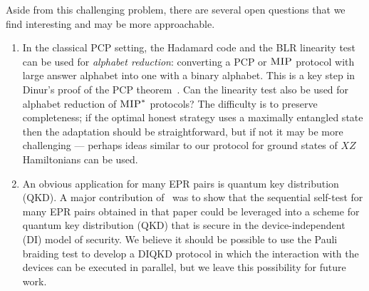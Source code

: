\documentclass[11pt,letterpaper]{article}
\newcommand{\<}{\langle}
\renewcommand{\>}{\rangle}
\newcommand{\MIP}{\textsc{MIP}}
\begin{document}
Aside from this challenging problem, there are several open questions that we find
interesting and may be more approachable.
\begin{enumerate}
\item In the classical PCP setting, the Hadamard code and the BLR
  linearity test can be used for \emph{alphabet reduction}: converting
  a PCP or $\MIP$ protocol with large answer alphabet into one with
  a binary alphabet. This is a key step in Dinur's proof of the PCP
  theorem~\cite{Dinur07pcp}. Can the linearity test also be used for
  alphabet reduction of $\MIP^*$ protocols? The difficulty is to preserve completeness; if the optimal honest strategy uses a maximally entangled state then the adaptation should be straightforward, but if not it may be more challenging --- perhaps ideas similar to our protocol for ground states of $XZ$ Hamiltonians can be used. 
\item 
  An obvious application for many EPR pairs is quantum key
  distribution (QKD). A major contribution
  of~\cite{ReichardtUV13nature} was to show that the sequential self-test for
  many EPR pairs obtained in that paper could be leveraged into a
  scheme for quantum key distribution (QKD) that is 
  secure in the device-independent (DI) model of security. We believe it should be possible to use the Pauli braiding test to develop a DIQKD protocol in which the interaction with the devices can be executed in parallel, but we leave this possibility for future work.


\end{enumerate}
\end{document}
